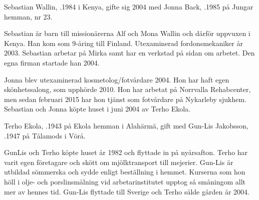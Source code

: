 
Sebastian Wallin, .1984 i Kenya, gifte sig 2004 med Jonna Back, .1985 på Jungar hemman, nr 23.
\begin{jhchildren}
  \item {}
  \item {}
  \item {}
\end{jhchildren}


Sebastian är barn till missionärerna Alf och Mona Wallin och därför	uppvuxen i Kenya. Han kom som 9-åring till Finland. Utexaminerad fordonsmekaniker år 2003. Sebastian arbetar på Mirka samt har en verkstad på sidan om arbetet. Den egna firman startade han 2004.

Jonna blev utexaminerad kosmetolog/fotvårdare 2004. Hon har haft egen skönhetssalong, som upphörde 2010. Hon har arbetat på Norrvalla Rehabcenter, men sedan februari 2015 har hon tjänst som fotvårdare på Nykarleby sjukhem. Sebastian och Jonna köpte huset i juni 2004  av Terho Ekola.


Terho Ekola, .1943 på Ekola hemman i Alahärmä, gift med Gun-Lis Jakobsson, .1947 på Tålamods i Vörå.
\begin{jhchildren}
  \item {}
  \item {}
  \item {}
\end{jhchildren}
GunLis och Terho köpte huset år 1982 och flyttade in på nyårsafton. Terho har varit egen företagare och skött om mjölktransport till mejerier. Gun-Lis är utbildad sömmerska och sydde enligt beställning i hemmet. Kurserna som hon höll i olje- och porslinsmålning vid arbetarinstitutet upptog så småningom allt mer av hennes tid. Gun-Lis flyttade till Sverige och Terho sålde gården år 2004.


